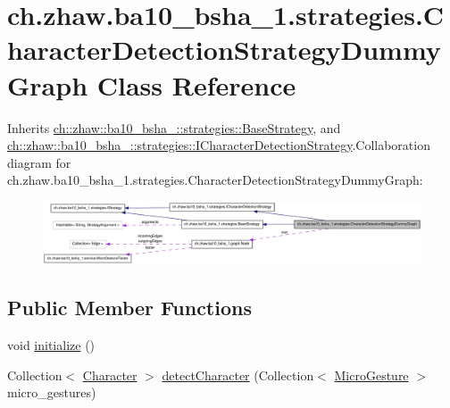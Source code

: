\hypertarget{classch_1_1zhaw_1_1ba10__bsha__1_1_1strategies_1_1CharacterDetectionStrategyDummyGraph}{
\section{ch.zhaw.ba10\_\-bsha\_\-1.strategies.CharacterDetectionStrategyDummyGraph Class Reference}
\label{classch_1_1zhaw_1_1ba10__bsha__1_1_1strategies_1_1CharacterDetectionStrategyDummyGraph}
}


Inherits \hyperlink{classch_1_1zhaw_1_1ba10__bsha__1_1_1strategies_1_1BaseStrategy}{ch::zhaw::ba10\_\-bsha\_::strategies::BaseStrategy}, and \hyperlink{interfacech_1_1zhaw_1_1ba10__bsha__1_1_1strategies_1_1ICharacterDetectionStrategy}{ch::zhaw::ba10\_\-bsha\_::strategies::ICharacterDetectionStrategy}.Collaboration diagram for ch.zhaw.ba10\_\-bsha\_\-1.strategies.CharacterDetectionStrategyDummyGraph:\nopagebreak
\begin{figure}[H]
\begin{center}
\leavevmode
\includegraphics[width=400pt]{classch_1_1zhaw_1_1ba10__bsha__1_1_1strategies_1_1CharacterDetectionStrategyDummyGraph__coll__graph}
\end{center}
\end{figure}
\subsection*{Public Member Functions}
\begin{DoxyCompactItemize}
\item 
void \hyperlink{classch_1_1zhaw_1_1ba10__bsha__1_1_1strategies_1_1CharacterDetectionStrategyDummyGraph_a5e2ad376333d4f59481d0600fec019f0}{initialize} ()
\item 
Collection$<$ \hyperlink{classch_1_1zhaw_1_1ba10__bsha__1_1_1Character}{Character} $>$ \hyperlink{classch_1_1zhaw_1_1ba10__bsha__1_1_1strategies_1_1CharacterDetectionStrategyDummyGraph_a6538ab532757576966ecf883ab771e32}{detectCharacter} (Collection$<$ \hyperlink{classch_1_1zhaw_1_1ba10__bsha__1_1_1service_1_1MicroGesture}{MicroGesture} $>$ micro\_\-gestures)
\end{DoxyCompactItemize}
